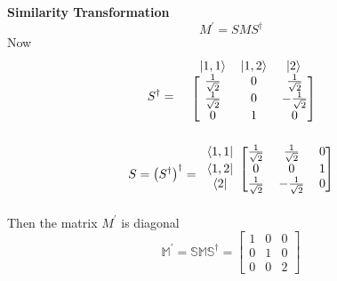 \begin{enumerate}
	\textbf{Similarity Transformation}
	\begin{equation}
		M^\prime = S M S^\dagger
	\end{equation}
	Now
	\begin{equation}
		S^\dagger =
		 \begin{blockarray}{cccc}
		\ & \ket{1,1} & \ket{1,2} & \ket{2}\\
		\begin{block}{c[ccc]}
		\ & \frac{1}{\sqrt{2}} & 0 & \frac{1}{\sqrt{2}}  \\
		\ & \frac{1}{\sqrt{2}} & 0 & -\frac{1}{\sqrt{2}}  \\
		\ & 0 & 1 & 0  \\
		\end{block}
		\end{blockarray} \\
	\end{equation}
	\begin{equation}
		S = \left(S^\dagger\right)^\dagger = 
 		\begin{blockarray}{cccc}
		\begin{block}{c[ccc]}
		\bra{1,1} & \frac{1}{\sqrt{2}} & \frac{1}{\sqrt{2}} & 0  \\
		\bra{1,2} & 0 & 0 & 1  \\
		\bra{2} & \frac{1}{\sqrt{2}} & -\frac{1}{\sqrt{2}} & 0  \\
		\end{block}
		\end{blockarray} \\
	\end{equation}
	Then the matrix $M^\prime$ is diagonal
	\begin{equation}
		\mathbb{M}^\prime = \mathbb{S}\mathbb{M}\mathbb{S}^\dagger = \left[\begin{matrix}
		1 & 0 & 0 \\ 0 & 1 & 0 \\ 0 & 0 & 2
		\end{matrix}\right]
	\end{equation}

	


	\end{enumerate}
